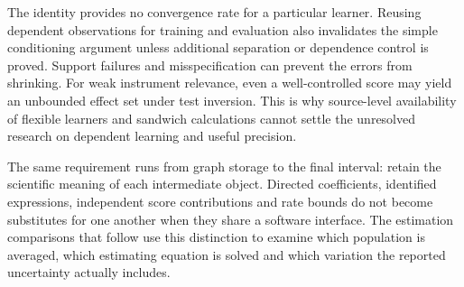 The identity provides no convergence rate for a particular learner. Reusing
dependent observations for training and evaluation also invalidates the simple
conditioning argument unless additional separation or dependence control is
proved. Support failures and misspecification can prevent the errors from
shrinking. For weak instrument relevance, even a well-controlled score may
yield an unbounded effect set under test inversion. This is why source-level
availability of flexible learners and sandwich calculations cannot settle
the unresolved research on dependent learning and useful precision.


The same requirement runs from graph storage to the final interval: retain
the scientific meaning of each intermediate object. Directed coefficients,
identified expressions, independent score contributions and rate bounds do
not become substitutes for one another when they share a software interface.
The estimation comparisons that follow use this distinction to examine which
population is averaged, which estimating equation is solved and which
variation the reported uncertainty actually includes.
